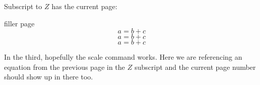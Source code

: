 \documentclass{article}
\begin{document}
Subscript to $Z$ has the current page:
\begin{center}
\end{center}

\clearpage
filler page
\begin{equation}
a=b+c\label{eq1}
\end{equation}
\begin{equation}
a=b+c\label{eq2}
\end{equation}
\begin{equation}
a=b+c\label{eq3}
\end{equation}

\newpage
In the third, hopefully the scale command works.
Here we are referencing an equation from the previous page in the $Z$ subscript and the current page number should show up in there too.

\begin{center}
\end{center}
\end{document}
